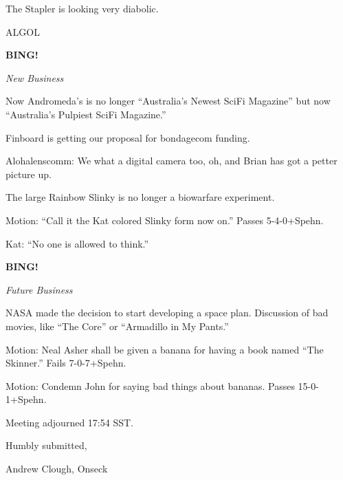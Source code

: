 \documentclass[12pt]{article}
\newcommand{\bing}{{\bf BING!} }
\newcommand{\goto}[1]{\bing \vskip 12pt \centerline{{\em{#1}}}}
\begin{document}
The Stapler is looking very diabolic.

ALGOL

\goto{New Business}

Now Andromeda's is no longer ``Australia's Newest SciFi Magazine'' but now ``Australia's Pulpiest SciFi Magazine.''

Finboard is getting our proposal for bondagecom funding.

Alohalenscomm:  We what a digital camera too, oh, and Brian has got a petter picture up.

The large Rainbow Slinky is no longer a biowarfare experiment.

Motion:  ``Call it the Kat colored Slinky form now on.''  Passes 5-4-0+Spehn.

Kat:  ``No one is allowed to think.''

\goto{Future Business}

NASA made the decision to start developing a space plan.
Discussion of bad movies, like ``The Core'' or ``Armadillo in My Pants.''

Motion: Neal Asher shall be given a banana for having a book named ``The Skinner.''  Fails 7-0-7+Spehn.

Motion:  Condemn John for saying bad things about bananas. Passes 15-0-1+Spehn.

\vspace{12pt}

\noindent
Meeting adjourned 17:54 SST.

\vspace{18pt}

\centerline{Humbly submitted,}
\centerline{Andrew Clough, Onseck}
\end{document}
